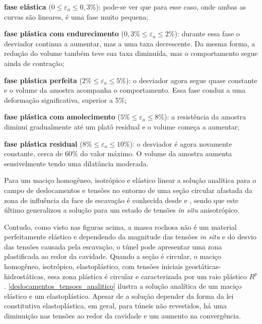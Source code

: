 \begin{alineas}
	
	\item \textbf{fase elástica} ($0\le \varepsilon_a \le 0,3\%$): pode-se ver que para esse caso, onde ambas as curvas são lineares, é uma fase muito pequena;
	
	\item \textbf{fase plástica com endurecimento} ($0,3\%\le \varepsilon_a \le 2\%$): durante essa fase o desviador continua a aumentar, mas a uma taxa decrescente. Da mesma forma, a redução do volume também teve sua taxa diminuída, mas o comportamento segue ainda de contração;
	
	\item \textbf{fase plástica perfeita} ($2\%\le \varepsilon_a \le 5\%$): o desviador agora segue quase constante e o volume da amostra acompanha o comportamento. Essa fase conduz a uma deformação significativa, superior a 5\%;
	
	\item \textbf{fase plástica com amolecimento} ($5\%\le \varepsilon_a \le 8\%$): a resistência da amostra diminui gradualmente até um platô residual e o volume começa a aumentar;
	
	\item \textbf{fase plástica residual} ($8\%\le \varepsilon_a \le 10\%$): o desviador é agora novamente constante, cerca de 60\% do valor máximo. O volume da amostra aumenta sensivelmente tendo uma dilatância moderada.
	
\end{alineas}

Para um maciço homogêneo, isotrópico e elástico linear a solução analítica para o campo de deslocamentos e tensões no entorno de uma seção circular afastada da zona de influência da face de escavação é conhecida desde  e , sendo que este último generalizou a solução para um estado de tensões \textit{in situ} anisotrópico. 

Contudo, como visto nas figuras acima, a massa rochosa não é um material perfeitamente elástico e dependendo da magnitude das tensões \textit{in situ} e do desvio das tensões causada pela escavação, o túnel pode apresentar uma zona plastificada ao redor da cavidade. Quando a seção é circular, o maciço homogêneo, isotrópico, elastoplástico, com tensões iniciais geostáticas-hidrostáticas, essa zona plástica é circular e caracterizada por um raio plástico $R^p$. \autoref{deslocamentos_tensoes_analitico} ilustra a solução analítica de um maciço elástico e um elastoplástico. Apesar de a solução depender da forma da lei constitutiva elastoplástica, em geral, para túneis não revestidos, há uma diminuição nas tensões ao redor da cavidade e um aumento na convergência.

